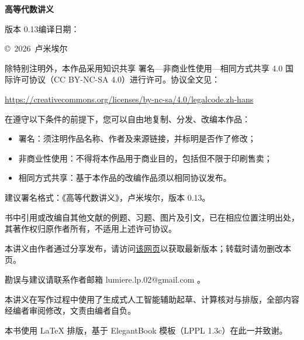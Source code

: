 \documentclass[lang=cn,10.5pt,scheme=chinese,toc=twocol,section,chinesefont=nofont,
twoside,citestyle=gb7714-2015,bibstyle=gb7714-2015]{elegantbook}
\newcommand{\noteversion}{0.13}
\DeclareRobustCommand{\textbf}[1]{{\lnsemiboldlatin\lnsemiboldcjk #1}}
\numberwithin{equation}{section}   %
\begin{document}
\begin{flushleft}
  \small
  \setlength{\parindent}{0pt}
  \setlength{\parskip}{0.6em}

  {\large\bfseries 高等代数讲义}\par
  版本 \noteversion\quad 编译日期：\notedate \par

  \copyright\ 2026\ 卢米埃尔\par

  \doclicenseImage[imagewidth=6em]\par

  除特别注明外，本作品采用\textbf{知识共享 署名—非商业性使用—相同方式共享 4.0 国际许可协议}（CC BY-NC-SA 4.0）进行许可。协议全文见：\par
  \url{https://creativecommons.org/licenses/by-nc-sa/4.0/legalcode.zh-hans}

  在遵守以下条件的前提下，您可以自由地复制、分发、改编本作品：
  \begin{itemize}
    \setlength{\itemsep}{0pt}
    \item \textbf{署名}：须注明作品名称、作者及来源链接，并标明是否作了修改；
    \item \textbf{非商业性使用}：不得将本作品用于商业目的，包括但不限于印刷售卖；
    \item \textbf{相同方式共享}：基于本作品的改编作品须以相同协议发布。
  \end{itemize}

  建议署名格式：《高等代数讲义》，卢米埃尔，版本 \noteversion。

  书中引用或改编自其他文献的例题、习题、图片及引文，已在相应位置注明出处，其著作权归原作者所有，不适用上述许可协议。

  本讲义由作者通过分享发布，请访问\href{https://lumierelp.github.io/linear-algebra-notes/linear-algebra.pdf}{该网页}以获取最新版本；转载时请勿删改本页。\par
  勘误与建议请联系作者邮箱 lumiere.lp.02@gmail.com 。

  本讲义在写作过程中使用了生成式人工智能辅助起草、计算核对与排版，全部内容经编者审阅修改，文责由编者自负。

  本书使用 \LaTeX{} 排版，基于 ElegantBook 模板（LPPL 1.3c）在此一并致谢。
\end{flushleft}
\vspace*{\fill}
\clearpage
\frontmatter

\end{document}
